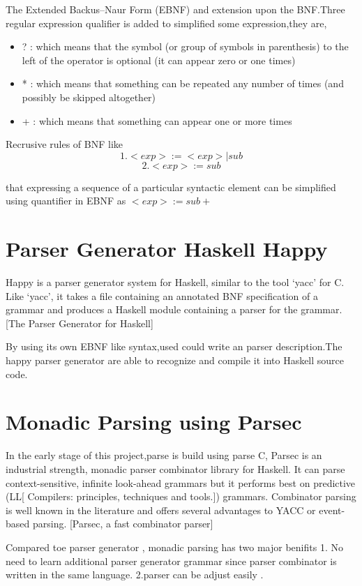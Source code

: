 The  Extended Backus–Naur Form (EBNF) and extension upon the BNF.Three regular expression qualifier is added to simplified some expression,they are,
\begin{itemize}
\item ? : which means that the symbol (or group of symbols in parenthesis) to the left of the operator is
optional (it can appear zero or one times)
\item * : which means that something can be repeated any number of times (and possibly be skipped
altogether)
\item + : which means that something can appear one or more times 
\end{itemize} \cite{book}

Recrusive rules of BNF  like 
\[   1. <exp> := <exp> | sub \]
\[	 2. <exp> := sub     \]
 
that expressing a sequence of a particular syntactic element can be simplified using quantifier in EBNF as $ <exp>:=sub+ $



\section{Parser Generator Haskell Happy}
Happy is a parser generator system for Haskell, similar to the tool `yacc' for C. Like `yacc', it takes a file containing an annotated BNF specification of a grammar and produces a Haskell module containing a parser for the grammar.
[The Parser Generator for Haskell] 

By using its own EBNF like syntax,used could write an parser description.The happy parser generator are able to recognize and compile it into Haskell source code.


\section{Monadic Parsing using Parsec}
In the early stage of this project,parse is build using parse C,
Parsec is an industrial strength, monadic parser combinator library for Haskell. It can parse context-sensitive, infinite look-ahead grammars but it performs best on
predictive (LL[ Compilers: principles, techniques and tools.]) grammars. Combinator parsing is well known in the literature
and offers several advantages to YACC or event-based parsing. [Parsec, a fast combinator parser] 

Compared toe parser generator , monadic parsing has two major benifits
1. No need to learn additional parser generator grammar since parser combinator is written in the same language. 2.parser can be adjust easily .




